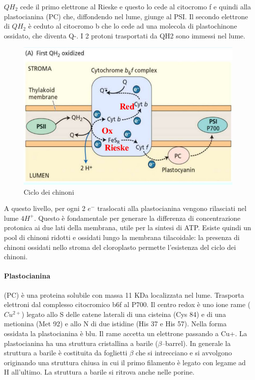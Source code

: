 \documentclass[a4paper,12pt]{book}
\begin{document}
$QH_{2}$ cede il primo elettrone al Rieske e questo lo cede al citocromo f e quindi alla plastocianina (PC) che, diffondendo nel lume, giunge al PSI. Il secondo elettrone di $QH_{2}$ è ceduto al citocromo b che lo cede ad una molecola di plastochinone ossidato, che diventa Q-. I 2 protoni trasportati da QH2 sono immessi nel lume.
\begin{figure}[H]
\centering
\includegraphics[scale=0.35]{immagini/chinone.jpg}
\caption{Ciclo dei chinoni}
\end{figure}
A questo livello, per ogni 2 $e^{-}$ traslocati alla plastocianina vengono rilasciati nel lume $4 H^{+}$. Questo è fondamentale per generare la differenza di concentrazione protonica ai due lati della membrana, utile per la sintesi di ATP. Esiste quindi un pool di chinoni ridotti e ossidati lungo la membrana tilacoidale: la presenza di chinoni ossidati nello stroma del cloroplasto permette l'esistenza del ciclo dei chinoni.

\paragraph{Plastocianina} 
(PC) è una proteina solubile con massa 11 KDa localizzata nel lume. Trasporta elettroni dal complesso
citocromico b6f al P700. Il centro redox è uno ione rame ($Cu^{2+}$) legato allo S delle catene laterali di una cisteina (Cys 84) e di una metionina (Met 92) e allo N di due istidine (His 37 e His 57). Nella forma ossidata la plastocianina è blu. Il rame accetta un elettrone passando a Cu+. La plastocianina ha una struttura cristallina a barile ($\beta$–barrel). In generale la struttura a barile è costituita da foglietti $\beta$ che si intrecciano e si avvolgono originando una struttura chiusa in cui il primo
filamento è legato con legame ad H all’ultimo. La struttura a barile si ritrova anche nelle porine.
\end{document}
